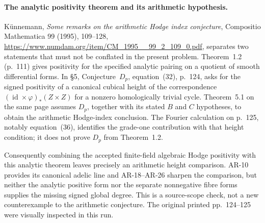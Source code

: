 \paragraph{The analytic positivity theorem and its arithmetic hypothesis.}
K\"unnemann, \emph{Some remarks on the arithmetic Hodge index
conjecture}, Compositio Mathematica 99 (1995), 109--128,
\url{https://www.numdam.org/item/CM_1995__99_2_109_0.pdf},
separates two statements that must not be conflated in the present
problem. Theorem~1.2 (p.~111) gives positivity for the specified
analytic pairing on a quotient of smooth differential forms. In
\S5, Conjecture~$D_p$, equation~(32), p.~124, asks for the signed
positivity of a canonical cubical height of the correspondence
$(\operatorname{id}\times\varphi)_*(Z\times Z)$ for a nonzero
homologically trivial cycle. Theorem~5.1 on the same page assumes
$D_p$, together with its stated $B$ and $C$ hypotheses, to obtain
the arithmetic Hodge-index conclusion. The Fourier calculation on
p.~125, notably equation~(36), identifies the grade-one contribution
with that height condition; it does not prove $D_p$ from Theorem~1.2.

Consequently combining the accepted finite-field algebraic Hodge
positivity with this analytic theorem leaves precisely an arithmetic
height comparison. AR-10 provides its canonical adelic line and
AR-18--AR-26 sharpen the comparison, but neither the analytic positive
form nor the separate nonnegative fibre forms supplies the missing
signed global degree. This is a source-scope check, not a new
counterexample to the arithmetic conjecture. The original printed
pp.~124--125 were visually inspected in this run.
